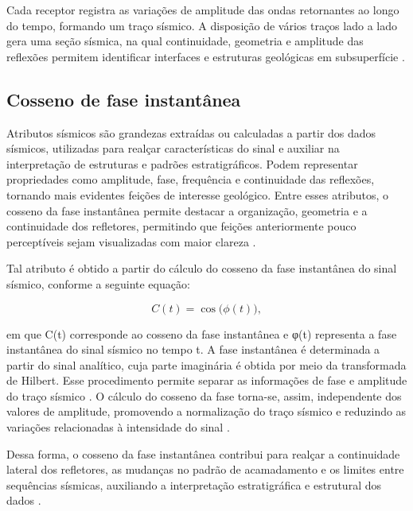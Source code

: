 Cada receptor registra as variações de amplitude das ondas retornantes ao longo do tempo, formando um traço sísmico. A disposição de vários traços lado a lado gera uma seção sísmica, na qual continuidade, geometria e amplitude das reflexões permitem identificar interfaces e estruturas geológicas em subsuperfície \cite{kearey2009,yilmaz2001}.

\subsection{Cosseno de fase instantânea}\label{sec:2-1-1}

Atributos sísmicos são grandezas extraídas ou calculadas a partir dos dados sísmicos, utilizadas para realçar características do sinal e auxiliar na interpretação de estruturas e padrões estratigráficos. Podem representar propriedades como amplitude, fase, frequência e continuidade das reflexões, tornando mais evidentes feições de interesse geológico. Entre esses atributos, o cosseno da fase instantânea permite destacar a organização, geometria e a continuidade dos refletores, permitindo que feições anteriormente pouco perceptíveis sejam visualizadas com maior clareza \cite{chopra2005}.

Tal atributo é obtido a partir do cálculo do cosseno da fase instantânea do sinal sísmico, conforme a seguinte equação:

\begin{equation}
  C(t)=\cos\bigl(\phi(t)\bigr),
  \label{eq:cosseno-fase}
\end{equation}

\noindent
em que C(t) corresponde ao cosseno da fase instantânea e φ(t) representa a fase instantânea do sinal sísmico no tempo t. A fase instantânea é determinada a partir do sinal analítico, cuja parte imaginária é obtida por meio da transformada de Hilbert. Esse procedimento permite separar as informações de fase e amplitude do traço sísmico \cite{chopra2007}. O cálculo do cosseno da fase torna-se, assim, independente dos valores de amplitude, promovendo a normalização do traço sísmico e reduzindo as variações relacionadas à intensidade do sinal \cite{meneses2010}.

Dessa forma, o cosseno da fase instantânea contribui para realçar a continuidade lateral dos refletores, as mudanças no padrão de acamadamento e os limites entre sequências sísmicas, auxiliando a interpretação estratigráfica e estrutural dos dados \cite{alvarenga2016}.

